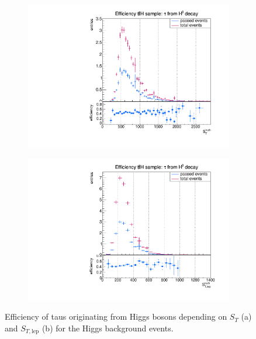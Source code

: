 \begin{figure}
  \centering
                \begin{subfigure}[t]{0.49\textwidth}
                \includegraphics[width=\textwidth]{figures/plots/ttH/Divided_fromHST.pdf}
                \label{Divided:fromH:ST}
                \end{subfigure}
                \begin{subfigure}[t]{0.49\textwidth}
                \includegraphics[width=\textwidth]{figures/plots/ttH/Divided_fromHSTlep.pdf}
                \label{Divided:fromH:STlep}
                \end{subfigure}
\caption[Efficiency of taus originating from Higgs bosons for the Higgs background events.]{Efficiency of taus originating from Higgs bosons depending on $S_{T}$ (a) and $S_{T,\text{lep}}$ (b) for the Higgs background events.}
\label{Divided:fromH:STgedöns}
\end{figure}
